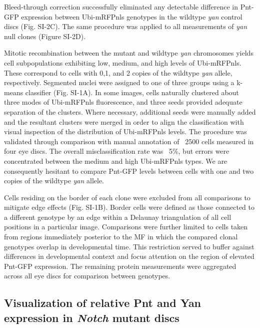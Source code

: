 Bleed-through correction successfully eliminated any detectable difference in Pnt-GFP expression between Ubi-mRFPnls genotypes in the wildtype \textit{yan} control discs (Fig. SI-2C). The same procedure was applied to all measurements of \textit{yan} null clones (Figure SI-2D).

Mitotic recombination between the mutant and wildtype \textit{yan} chromosomes yields cell subpopulations exhibiting low, medium, and high levels of Ubi-mRFPnls. These correspond to cells with 0,1, and 2 copies of the wildtype \textit{yan} allele, respectively. Segmented nuclei were assigned to one of three groups using a k-means classifier (Fig. SI-1A). In some images, cells naturally clustered about three modes of Ubi-mRFPnls fluorescence, and three seeds provided adequate separation of the clusters. Where necessary, additional seeds were manually added and the resultant clusters were merged in order to align the classification with visual inspection of the distribution of Ubi-mRFPnls levels. The procedure was validated through comparison with manual annotation of ~2500 cells measured in four eye discs. The overall misclassification rate was ~5\%, but errors were concentrated between the medium and high Ubi-mRFPnls types. We are consequently hesitant to compare Pnt-GFP levels between cells with one and two copies of the wildtype \textit{yan} allele.

Cells residing on the border of each clone were excluded from all comparisons to mitigate edge effects (Fig. SI-1B). Border cells were defined as those connected to a different genotype by an edge within a Delaunay triangulation of all cell positions in a particular image. Comparisons were further limited to cells taken from regions immediately posterior to the MF in which the compared clonal genotypes overlap in developmental time. This restriction served to buffer against differences in developmental context and focus attention on the region of elevated Pnt-GFP expression. The remaining protein measurements were aggregated across all eye discs for comparison between genotypes.





\subsection{Visualization of relative Pnt and Yan expression in \textit{Notch} mutant discs}


